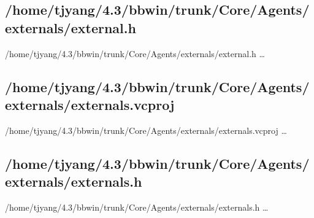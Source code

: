 %




\subsection{/home/tjyang/4.3/bbwin/trunk/Core/Agents/externals/external.h}
\lstset{numberstyle=\tiny,numbers=left,
   breaklines=true,
   stepnumber=1,numbersep=5pt,firstnumber=1,
   xleftmargin=12pt,showstringspaces=false}
\noindent /home/tjyang/4.3/bbwin/trunk/Core/Agents/externals/external.h  \ldots



\subsection{/home/tjyang/4.3/bbwin/trunk/Core/Agents/externals/externals.vcproj}
\lstset{numberstyle=\tiny,numbers=left,
   breaklines=true,
   stepnumber=1,numbersep=5pt,firstnumber=1,
   xleftmargin=12pt,showstringspaces=false}
\noindent /home/tjyang/4.3/bbwin/trunk/Core/Agents/externals/externals.vcproj  \ldots



\subsection{/home/tjyang/4.3/bbwin/trunk/Core/Agents/externals/externals.h}
\lstset{numberstyle=\tiny,numbers=left,
   breaklines=true,
   stepnumber=1,numbersep=5pt,firstnumber=1,
   xleftmargin=12pt,showstringspaces=false}
\noindent /home/tjyang/4.3/bbwin/trunk/Core/Agents/externals/externals.h  \ldots



%


